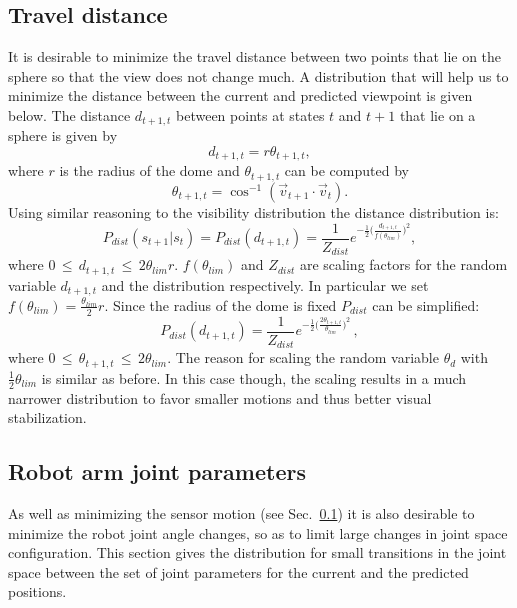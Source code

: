 \documentclass[10pt,twocolumn,letterpaper]{article}
\begin{document}
\subsection{Travel distance} \label{sec:distance}
It is desirable to minimize the travel distance between two points that lie on the sphere so that the view does not change much. A distribution that will help us to minimize the distance between the current and predicted viewpoint is given below. 
The distance $d_{t+1,t}$ between points at states $t$ and $t+1$ that lie on a sphere is given by 
\begin{equation}
  d_{t+1,t}=r\theta_{t+1,t},
\end{equation}
where $r$ is the radius of the dome and $\theta_{t+1,t}$ can be computed by
\begin{equation}
  \theta_{t+1,t} = \cos^{-1}(\vec{v}_{t+1} \cdot \vec{v}_{t}).
\end{equation}
Using similar reasoning to the visibility distribution the distance distribution is:
\begin{equation}
 P_{dist}(s_{t+1}|s_{t})=P_{dist}(d_{t+1,t}) = \frac{1}{Z_{dist}} e^{-\frac{1}{2} \big(\frac{d_{t+1,t}}{f(\theta_{lim})} \big)^2},
\end{equation}
where $0 \,\leq \,d_{t+1,t} \,\leq\, 2\theta_{lim}r$. $f(\theta_{lim})$ and $Z_{dist}$ are scaling factors for the random variable $d_{t+1,t}$ and the distribution respectively. 
In particular we set $f(\theta_{lim})=\frac{\theta_{lim}}{2}r$. 
Since the radius of the dome is fixed $P_{dist}$ can be simplified:
\begin{equation}
  P_{dist}(d_{t+1,t}) = 
  \frac{1}{Z_{dist}} e^{-\frac{1}{2} \big(\frac{2 \theta_{t+1,t}}{\theta_{lim}} \big)^2} \,,
\end{equation}
where $0 \,\leq \,\theta_{t+1,t} \,\leq\, 2\theta_{lim}$.  
The reason for scaling the random variable $\theta_{d}$ with $\frac{1}{2}\theta_{lim}$ is similar as before. 
In this case though, the scaling results in a much narrower distribution to favor smaller motions and thus better visual stabilization.

\subsection{Robot arm joint parameters}
As well as minimizing the sensor motion (see Sec.~\ref{sec:distance}) it is also desirable to minimize the robot joint angle changes, so as to limit large changes in joint space configuration. 
This section gives the distribution for small transitions in the joint space between the set of joint parameters for the current and the predicted positions. 
\end{document}
